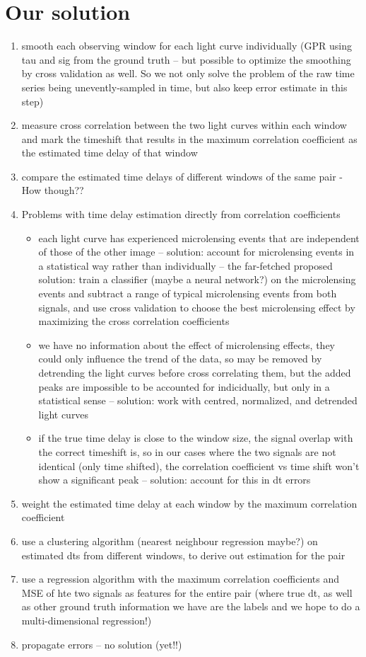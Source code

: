 \documentclass[a4paper, 11pt]{article}
\begin{document}
\section{Our solution}
  \begin{enumerate}
    \item smooth each observing window for each light curve individually (GPR using tau and sig from the ground truth -- but possible to optimize the smoothing by cross validation as well. So we not only solve the problem of the raw time series being unevently-sampled in time, but also keep error estimate in this step)
    \item measure cross correlation between the two light curves within each window and mark the timeshift that results in the maximum correlation coefficient as the estimated time delay of that window
    \item compare the estimated time delays of different windows of the same pair - How though??
    \item Problems with time delay estimation directly from correlation coefficients
    \begin{itemize}
      \item each light curve has experienced microlensing events that are independent of those of the other image -- solution: account for microlensing events in a statistical way rather than individually -- the far-fetched proposed solution: train a classifier (maybe a neural network?) on the microlensing events and subtract a range of typical microlensing events from both signals, and use cross validation to choose the best microlensing effect by maximizing the cross correlation coefficients
      \item we have no information about the effect of microlensing effects, they could only influence the trend of the data, so may be removed by detrending the light curves before cross correlating them, but the added peaks are impossible to be accounted for indicidually, but only in a statistical sense -- solution:  work with centred, normalized, and detrended light curves
      \item if the true time delay is close to the window size, the signal overlap with the correct timeshift is, so in our cases where the two signals are not identical (only time shifted), the correlation coefficient vs time shift won't show a significant peak -- solution: account for this in dt errors
    \end{itemize}
    \item weight the estimated time delay at each window by the maximum correlation coefficient
    \item use a clustering algorithm (nearest neighbour regression maybe?) on estimated dts from different windows, to derive out estimation for the pair
    \item use a regression algorithm with the maximum correlation coefficients and MSE of hte two signals as features for the entire pair (where true dt, as well as other ground truth information we have are the labels and we hope to do a multi-dimensional regression!)
    \item propagate errors -- no solution (yet!!)
\end{enumerate}
\end{document}
